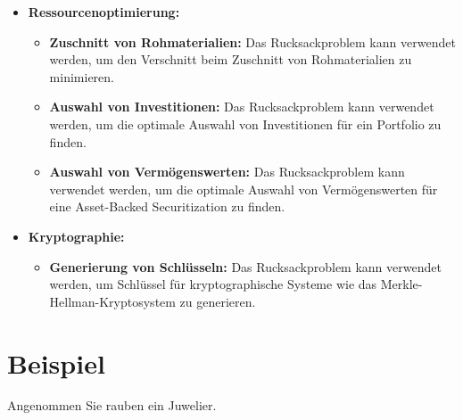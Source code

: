 \documentclass[12pt]{report}
\begin{document}
	\begin{itemize}
		\item \textbf{Ressourcenoptimierung:}
		\begin{itemize}
			\item \textbf{Zuschnitt von Rohmaterialien:} Das Rucksackproblem kann verwendet werden, um den Verschnitt beim Zuschnitt von Rohmaterialien zu minimieren.\cite{kellerer2004knapsack} 
			\item \textbf{Auswahl von Investitionen:} Das Rucksackproblem kann verwendet werden, um die optimale Auswahl von Investitionen für ein Portfolio zu finden.\cite{kellerer2004knapsack}
			\item \textbf{Auswahl von Vermögenswerten:} Das Rucksackproblem kann verwendet werden, um die optimale Auswahl von Vermögenswerten für eine Asset-Backed Securitization zu finden.\cite{kellerer2004knapsack}
		\end{itemize}
		\item \textbf{Kryptographie:}
		\begin{itemize}
			\item \textbf{Generierung von Schlüsseln:} Das Rucksackproblem kann verwendet werden, um Schlüssel für kryptographische Systeme wie das Merkle-Hellman-Kryptosystem zu generieren.\cite{kellerer2004knapsack}
		\end{itemize}
	\end{itemize}


	\section{Beispiel}
	Angenommen Sie rauben ein Juwelier.  
	
	
	
	
\end{document}
